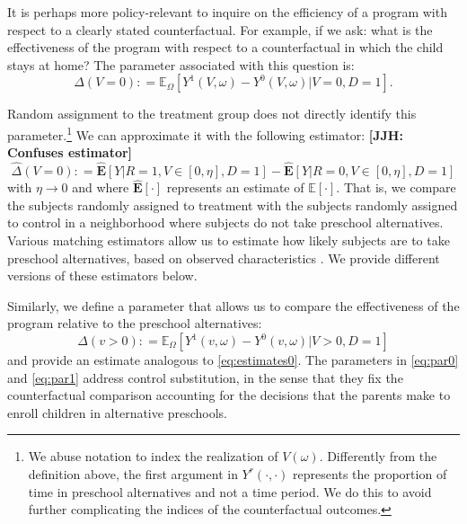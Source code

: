 It is perhaps more policy-relevant to inquire on the efficiency of a program with respect to a clearly stated counterfactual. For example, if we ask: what is the effectiveness of the program with respect to a counterfactual in which the child stays at home? The parameter associated with this question is:
\begin{equation}
\Delta \left(V = 0 \right) : =   \mathbb{E}_{\Omega} \left[ Y^1 \left( V, \omega \right) - Y^0 \left( V, \omega \right) | V = 0, D = 1 \right]. \label{eq:par0}
\end{equation}

Random assignment to the treatment group does not directly identify this parameter.\footnote{We abuse notation to index the realization of $V \left( \omega \right)$. Differently from the definition above, the first argument in $Y^r \left( \cdot, \cdot \right)$ represents the proportion of time in preschool alternatives and not a time period. We do this to avoid further complicating the indices of the counterfactual outcomes.} We can approximate it with the following estimator: \textbf{[JJH: Confuses estimator]}
\begin{equation}
\widehat{\Delta} \left(V = 0 \right) : = \widehat{\mathbf{E}} \left[ Y | R = 1, V \in \left[ 0 , \eta \right], D = 1 \right] - \widehat{\mathbf{E}} \left[ Y | R = 0, V \in \left[ 0 , \eta \right], D = 1 \right] \label{eq:estimates0}
\end{equation}
with $\eta \rightarrow 0$ and where $\widehat{\mathbf{E}}[\cdot]$ represents an estimate of $\mathbb{E}[\cdot]$. That is, we compare the subjects randomly assigned to treatment with the subjects randomly assigned to control in a neighborhood where subjects do not take preschool alternatives. Various matching estimators allow us to estimate how likely subjects are to take preschool alternatives, based on observed characteristics \citep{Heckman_Ichimura_etal_1997_REStud,Heckman_Ichimura_etal_1998_REStud}. We provide different versions of these estimators below.

Similarly, we define a parameter that allows us to compare the effectiveness of the program relative to the preschool alternatives:
\begin{equation}
\Delta \left( v > 0 \right) : =   \mathbb{E}_{\Omega} \left[ Y^1 \left( v, \omega \right) - Y^0 \left( v, \omega \right) | V > 0, D = 1 \right] \label{eq:par1}
\end{equation}
and provide an estimate analogous to \eqref{eq:estimates0}. The parameters in \eqref{eq:par0} and \eqref{eq:par1} address control substitution, in the sense that they fix the counterfactual comparison accounting for the decisions that the parents make to enroll children in alternative preschools.

